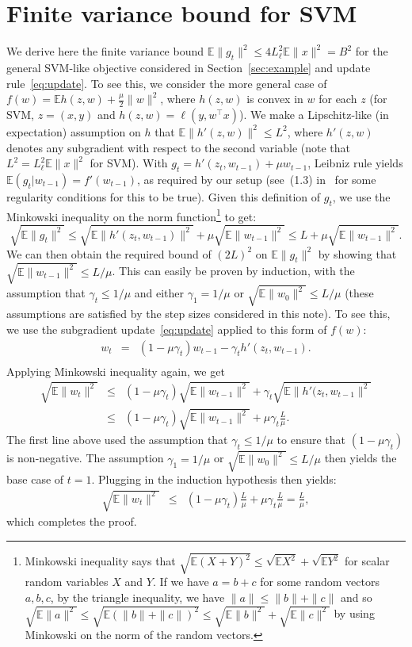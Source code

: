 \documentclass[11pt]{article}
\newcommand{\BEAS}{\begin{eqnarray*}}
\newcommand{\EEAS}{\end{eqnarray*}}
\def \E { \mathbb{E} }
\begin{document}
 \section{Finite variance bound for SVM} \label{sec:SVMbound}
 We derive here the finite variance bound $\E \| g_t \|^2  \leq  4 L^2_{\ell} \E \| x\|^2 = B^2$ for the general SVM-like objective considered in Section~\ref{sec:example} and update rule~\eqref{eq:update}. To see this, we consider the more general case of $f(w) = \E h(z,w) + \frac{\mu}{2} \| w\|^2$, where $h(z,w)$ is convex in $w$ for each $z$ (for SVM, $z=(x,y)$ and $h(z,w) = \ell(y,w^\top x)$). We make a Lipschitz-like (in expectation) assumption on $h$ that $\E \| h'(z,w) \|^2 \leq L^2$, where $h'(z,w)$ denotes any subgradient with respect to the second variable (note that $L^2 = L^2_{\ell} \E \| x\|^2$ for SVM). With $g_t = h'(z_t,w_{t-1})+\mu w_{t-1}$, Leibniz rule yields $\E (g_t | w_{t-1}) = f'(w_{t-1})$, as required by our setup (see~(1.3) in~\cite{nemirovski2009robust} for some regularity conditions for this to be true). Given this definition of $g_t$, we use the Minkowski inequality on the norm function\footnote{Minkowski inequality says that $\sqrt{\E (X+Y)^2} \leq \sqrt{\E X^2} + \sqrt{\E Y^2}$ for scalar random variables $X$ and $Y$. If we have $a=b+c$ for some random vectors $a,b,c$, by the triangle inequality, we have $\|a\|\leq\|b\|+\|c\|$ and so $\sqrt{\E \|a\|^2} \leq \sqrt{\E (\|b\|+\|c\|)^2} \leq \sqrt{\E \|b\|^2} + \sqrt{\E \|c\|^2}$ by using Minkowski on the norm of the random vectors.} to get:
 $$
 	\sqrt{\E \| g_t \|^2} \leq \sqrt{\E \| h'(z_t,w_{t-1}) \|^2} + \mu \sqrt{\E \| w_{t-1} \|^2}
 	\leq L + \mu \sqrt{\E \| w_{t-1} \|^2}.
 $$
We can then obtain the required bound of $(2L)^2$ on $\E \| g_t \|^2$ by showing that $\sqrt{\E \| w_{t-1} \|^2} \leq L/\mu$. This can easily be proven by induction, with the assumption that $\gamma_t \leq 1/\mu$ and either $\gamma_1 = 1/\mu$ or $\sqrt{\E \|w_0 \|^2} \leq L/\mu$ (these assumptions are satisfied by the step sizes considered in this note). To see this, we use the subgradient update~\eqref{eq:update} applied to this form of $f(w)$:
 \BEAS
w_t & = & (1-\mu \gamma_t) w_{t-1} - \gamma_t h'(z_t, w_{t-1}). \\
 \EEAS
Applying Minkowski inequality again, we get
 \BEAS
\sqrt{\E \| w_t \|^2} & \leq &(1-\mu \gamma_t) \sqrt{\E \| w_{t-1} \|^2}+ \gamma_t \sqrt{\E \| h'(z_t,w_{t-1} \|^2} \\
& \leq & (1-\mu \gamma_t) \sqrt{\E \| w_{t-1} \|^2} + \mu \gamma_t \frac{L}{\mu}.
 \EEAS
The first line above used the assumption that $\gamma_t \leq 1/\mu$ to ensure that $(1-\mu \gamma_t)$ is non-negative. The assumption $\gamma_1 = 1/\mu$ or $\sqrt{\E \|w_0 \|^2} \leq L/\mu$ then yields the base case of $t=1$. Plugging in the induction hypothesis then yields:
 \BEAS
\sqrt{\E \| w_t \|^2} & \leq &(1-\mu \gamma_t) \frac{L}{\mu} + \mu \gamma_t \frac{L}{\mu} = \frac{L}{\mu},
 \EEAS
which completes the proof.
  

 
 
   
\end{document}
